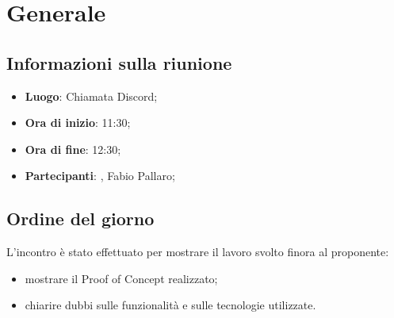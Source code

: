 \section{Generale}

\vspace{10pt}


\subsection{Informazioni sulla riunione}
\begin{itemize}
	\item \textbf{Luogo}: Chiamata Discord\glo{};
	\item \textbf{Ora di inizio}: 11:30;
	\item \textbf{Ora di fine}: 12:30;
	\item \textbf{Partecipanti}: \team, Fabio Pallaro;
\end{itemize}

\vspace{5pt}

\subsection{Ordine del giorno}
L'incontro è stato effettuato per mostrare il lavoro svolto finora al proponente:
\begin{itemize}
	\item mostrare il Proof of Concept realizzato;
	\item chiarire dubbi sulle funzionalità e sulle tecnologie utilizzate.
\end{itemize}

